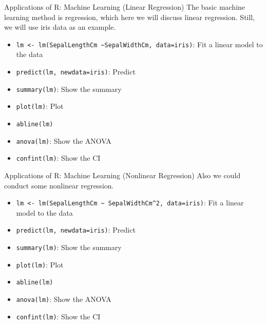 \documentclass[aspectratio=169]{beamer}
\begin{document}
    \begin{frame}{Applications of R: Machine Learning (Linear Regression)}
        The basic machine learning method is regression, which here we will discuss linear regression. Still, we will use iris data as an example.\par
        \begin{itemize}
            \item \texttt{lm <- lm(SepalLengthCm \textasciitilde SepalWidthCm, data=iris)}: Fit a linear model to the data
            \item \texttt{predict(lm, newdata=iris)}: Predict
            \item \texttt{summary(lm)}: Show the summary
            \item \texttt{plot(lm)}: Plot 
            \item \texttt{abline(lm)}
            \item \texttt{anova(lm)}: Show the ANOVA
            \item \texttt{confint(lm)}: Show the CI
        \end{itemize}
    \end{frame}


    \begin{frame}{Applications of R: Machine Learning (Nonlinear Regression)}
        Also we could conduct some nonlinear regression.\par
        \begin{itemize}
            \item \texttt{lm <- lm(SepalLengthCm \textasciitilde{} SepalWidthCm\textasciicircum{}2, data=iris)}: Fit a linear model to the data
            \item \texttt{predict(lm, newdata=iris)}: Predict
            \item \texttt{summary(lm)}: Show the summary
            \item \texttt{plot(lm)}: Plot 
            \item \texttt{abline(lm)}
            \item \texttt{anova(lm)}: Show the ANOVA
            \item \texttt{confint(lm)}: Show the CI
        \end{itemize}
    \end{frame}
\end{document}
